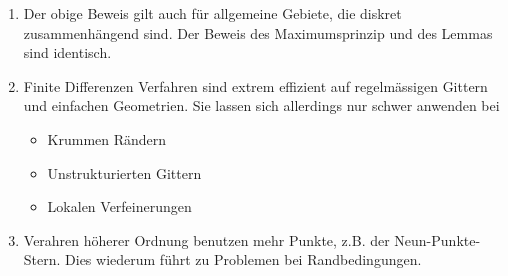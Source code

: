 \begin{bem}
\begin{enumerate}
\item Der obige Beweis gilt auch für allgemeine Gebiete, die diskret zusammenhängend sind. Der Beweis
des Maximumsprinzip und des Lemmas sind identisch.
\item Finite Differenzen Verfahren sind extrem effizient auf regelmässigen Gittern und einfachen 
Geometrien. Sie lassen sich allerdings nur schwer anwenden bei
\begin{itemize}
\item Krummen Rändern
\item Unstrukturierten Gittern
\item Lokalen Verfeinerungen
\end{itemize}
\item Verahren höherer Ordnung benutzen mehr Punkte, z.B. der Neun-Punkte-Stern. Dies wiederum führt zu
Problemen bei Randbedingungen.
\end{enumerate}
\end{bem}






